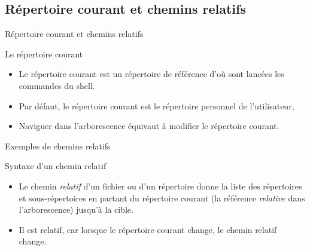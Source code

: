 
\subsection{Répertoire courant et chemins relatifs}
\begin{frame}{Répertoire courant et chemins relatifs}
  \begin{block}{Le répertoire courant}
    \begin{itemize}
    \item Le répertoire courant est un répertoire de référence d'où sont
      lancées les commandes du shell.
    \item Par défaut, le répertoire courant est le répertoire personnel
      de l'utilisateur,
    \item Naviguer dans l'arborescence équivaut à modifier le répertoire
      courant.
    \end{itemize}
  \end{block}
  \begin{block}{Exemples de chemins relatifs}
  \end{block}
  \begin{alertblock}{Syntaxe d'un chemin relatif}
    \begin{itemize}
    \item Le chemin \textit{relatif} d'un fichier ou d'un répertoire donne la liste des répertoires et sous-répertoires en partant du répertoire courant (la référence \textit{relative} dans l'arborescence) jusqu'à la cible.
    \item Il est relatif, car lorsque le répertoire courant change, le chemin relatif change.
    \end{itemize}
  \end{alertblock}
\end{frame}
